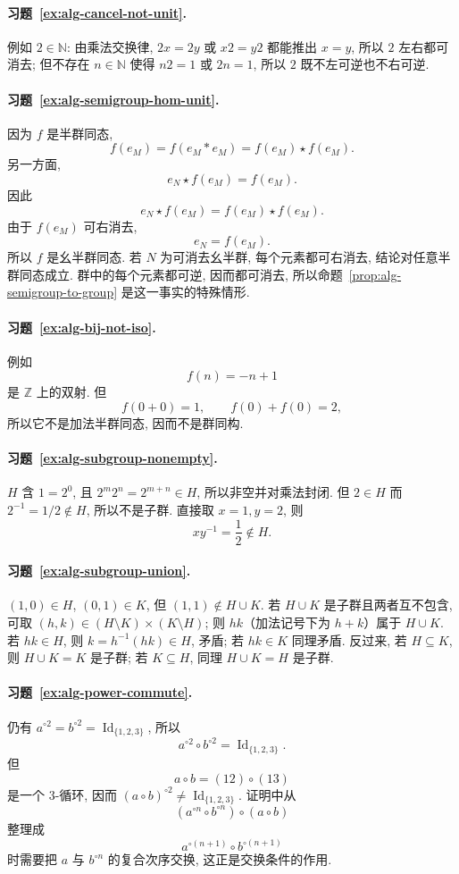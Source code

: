 \documentclass[usesamecnt, thmcnt=section, lang=cn, newtx, 10pt, scheme=chinese]{elegantbook}
\begin{document}
\paragraph*{习题~\ref{ex:alg-cancel-not-unit}.}
例如 $2\in\mathbb N$: 由乘法交换律, $2x=2y$ 或 $x2=y2$ 都能推出 $x=y$, 所以 $2$ 左右都可消去; 但不存在 $n\in\mathbb N$ 使得 $n2=1$ 或 $2n=1$, 所以 $2$ 既不左可逆也不右可逆.



\paragraph*{习题~\ref{ex:alg-semigroup-hom-unit}.}
因为 $f$ 是半群同态,
\[
 f(e_M)
 =f(e_M*e_M)
 =f(e_M)\star f(e_M).
\]
另一方面,
\[
 e_N\star f(e_M)=f(e_M).
\]
因此
\[
 e_N\star f(e_M)=f(e_M)\star f(e_M).
\]
由于 $f(e_M)$ 可右消去,
\[
 e_N=f(e_M).
\]
所以 $f$ 是幺半群同态. 若 $N$ 为可消去幺半群, 每个元素都可右消去, 结论对任意半群同态成立. 群中的每个元素都可逆, 因而都可消去, 所以命题~\ref{prop:alg-semigroup-to-group} 是这一事实的特殊情形.



\paragraph*{习题~\ref{ex:alg-bij-not-iso}.}
例如
\[
 f(n)=-n+1
\]
是 $\mathbb Z$ 上的双射. 但
\[
 f(0+0)=1,
 \qquad
 f(0)+f(0)=2,
\]
所以它不是加法半群同态, 因而不是群同构.

\paragraph*{习题~\ref{ex:alg-subgroup-nonempty}.}
$H$ 含 $1=2^0$, 且 $2^m2^n=2^{m+n}\in H$, 所以非空并对乘法封闭. 但 $2\in H$ 而 $2^{-1}=1/2\notin H$, 所以不是子群. 直接取 $x=1,y=2$, 则
\[
 xy^{-1}=\frac12\notin H.
\]

\paragraph*{习题~\ref{ex:alg-subgroup-union}.}
$(1,0)\in H$, $(0,1)\in K$, 但 $(1,1)\notin H\cup K$. 若 $H\cup K$ 是子群且两者互不包含, 可取 $(h,k)\in(H\setminus K)\times(K\setminus H)$; 则 $hk$（加法记号下为 $h+k$）属于 $H\cup K$. 若 $hk\in H$, 则 $k=h^{-1}(hk)\in H$, 矛盾; 若 $hk\in K$ 同理矛盾. 反过来, 若 $H\subseteq K$, 则 $H\cup K=K$ 是子群; 若 $K\subseteq H$, 同理 $H\cup K=H$ 是子群.

\paragraph*{习题~\ref{ex:alg-power-commute}.}
仍有 $a^{\circ 2}=b^{\circ 2}=\operatorname{Id}_{\{1,2,3\}}$, 所以
\[
 a^{\circ 2}\circ b^{\circ 2}=\operatorname{Id}_{\{1,2,3\}}.
\]
但
\[
 a\circ b=(12)\circ(13)
\]
是一个 $3$-循环, 因而 $(a\circ b)^{\circ 2}\neq\operatorname{Id}_{\{1,2,3\}}$. 证明中从
\[
 (a^{\circ n}\circ b^{\circ n})\circ(a\circ b)
\]
整理成
\[
 a^{\circ(n+1)}\circ b^{\circ(n+1)}
\]
时需要把 $a$ 与 $b^{\circ n}$ 的复合次序交换, 这正是交换条件的作用.
\end{document}
